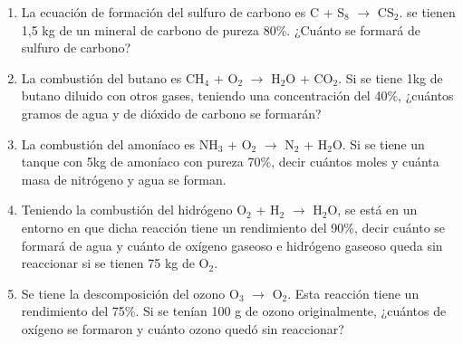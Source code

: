 \begin{enumerate}
\item La ecuación de formación del sulfuro de carbono es C + S$_8$ $\longrightarrow$ CS$_2$. se tienen 1,5 kg de un mineral de carbono de pureza 80\%. ¿Cuánto se formará de sulfuro de carbono?

\item La combustión del butano es CH$_4$ + O$_2$ $\longrightarrow$ H$_2$O + CO$_2$. Si se tiene 1kg de butano diluido con otros gases, teniendo una concentración del 40$\%$, ¿cuántos gramos de agua y de dióxido de carbono se formarán?

\item La combustión del amoníaco es NH$_3$ + O$_2$ $\longrightarrow$ N$_2$ + H$_2$O. Si se tiene un tanque con 5kg de amoníaco con pureza 70\%, decir cuántos moles y cuánta masa de nitrógeno y agua se forman.

\item Teniendo la combustión del hidrógeno O$_2$ + H$_2$ $\longrightarrow$ H$_2$O, se está en un entorno en que dicha reacción tiene un rendimiento del 90\%, decir cuánto se formará de agua y cuánto de oxígeno gaseoso e hidrógeno gaseoso queda sin reaccionar si se tienen 75 kg de O$_2$.

\item Se tiene la descomposición del ozono O$_3$ $\longrightarrow$ O$_2$. Esta reacción tiene un rendimiento del 75\%. Si se tenían 100 g de ozono originalmente, ¿cuántos de oxígeno se formaron y cuánto ozono quedó sin reaccionar?
    
\end{enumerate}
